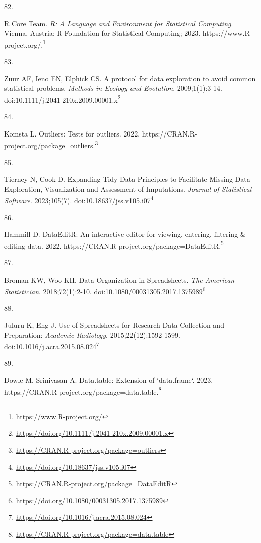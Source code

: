 \documentclass[
  a4paper,
]{book}
\newlength{\cslhangindent}
\newlength{\csllabelwidth}
\newlength{\cslentryspacingunit} %
\newenvironment{CSLReferences}[2] %
 {%
  \setlength{\parindent}{0pt}
  \ifodd #1
  \let\oldpar\par
  \def\par{\hangindent=\cslhangindent\oldpar}
  \fi
  \setlength{\parskip}{#2\cslentryspacingunit}
 }%
 {}
\newcommand{\CSLLeftMargin}[1]{\parbox[t]{\csllabelwidth}{#1}}
\newcommand{\CSLRightInline}[1]{\parbox[t]{\linewidth - \csllabelwidth}{#1}\break}
\renewcommand{\href}[2]{#2\footnote{\url{#1}}}
\begin{document}
\begin{CSLReferences}{0}{0}
\leavevmode{}%
\CSLLeftMargin{82. }%
\CSLRightInline{R Core Team. \emph{{R}: A Language and Environment for Statistical Computing}. Vienna, Austria: R Foundation for Statistical Computing; 2023. \href{https://www.R-project.org/}{https://www.R-project.org/.}}

\leavevmode{}%
\CSLLeftMargin{83. }%
\CSLRightInline{Zuur AF, Ieno EN, Elphick CS. A protocol for data exploration to avoid common statistical problems. \emph{Methods in Ecology and Evolution}. 2009;1(1):3-14. doi:\href{https://doi.org/10.1111/j.2041-210x.2009.00001.x}{10.1111/j.2041-210x.2009.00001.x}}

\leavevmode{}%
\CSLLeftMargin{84. }%
\CSLRightInline{Komsta L. Outliers: Tests for outliers. 2022. \href{https://CRAN.R-project.org/package=outliers}{https://CRAN.R-project.org/package=outliers.}}

\leavevmode{}%
\CSLLeftMargin{85. }%
\CSLRightInline{Tierney N, Cook D. Expanding Tidy Data Principles to Facilitate Missing Data Exploration, Visualization and Assessment of Imputations. \emph{Journal of Statistical Software}. 2023;105(7). doi:\href{https://doi.org/10.18637/jss.v105.i07}{10.18637/jss.v105.i07}}

\leavevmode{}%
\CSLLeftMargin{86. }%
\CSLRightInline{Hammill D. DataEditR: An interactive editor for viewing, entering, filtering \& editing data. 2022. \href{https://CRAN.R-project.org/package=DataEditR}{https://CRAN.R-project.org/package=DataEditR.}}

\leavevmode{}%
\CSLLeftMargin{87. }%
\CSLRightInline{Broman KW, Woo KH. Data Organization in Spreadsheets. \emph{The American Statistician}. 2018;72(1):2-10. doi:\href{https://doi.org/10.1080/00031305.2017.1375989}{10.1080/00031305.2017.1375989}}

\leavevmode{}%
\CSLLeftMargin{88. }%
\CSLRightInline{Juluru K, Eng J. Use of Spreadsheets for Research Data Collection and Preparation: \emph{Academic Radiology}. 2015;22(12):1592-1599. doi:\href{https://doi.org/10.1016/j.acra.2015.08.024}{10.1016/j.acra.2015.08.024}}

\leavevmode{}%
\CSLLeftMargin{89. }%
\CSLRightInline{Dowle M, Srinivasan A. Data.table: Extension of `data.frame`. 2023. \href{https://CRAN.R-project.org/package=data.table}{https://CRAN.R-project.org/package=data.table.}}


\end{CSLReferences}
\end{document}
